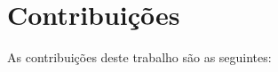 








\section{Contribuições}
\label{sec:contribucoes}
As contribuições deste trabalho são as seguintes:

